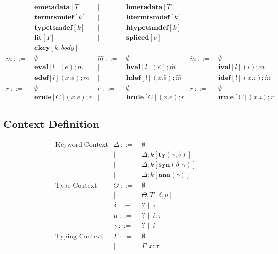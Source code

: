 \documentclass[letterpaper, notitlepage]{article}
\begin{document}
\[\begin{array}{rlrlrl}
				| ~ &~ \mathbf{emetadata}[T]     		& 		 	| ~ &~	\mathbf{hmetadata}[T]\\
				| ~ &~ \mathbf{termtsmdef}[k]     		&			| ~ &~ 	\mathbf{htermtsmdef}[k]\\
				| ~ &~ \mathbf{typetsmdef}[k]			& 			| ~ &~ 	\mathbf{htypetsmdef}[k]\\
				| ~ &~ \mathbf{lit}[T]					& 		 	| ~ &~ 	\mathbf{spliced}[e]\\
				| ~ &~ \mathbf{ekey}[k,body]\\
	m 			~::=&~ \emptyset						&\hat{m}	~::=&~ \emptyset								&\dot{m}	~::=&~ \emptyset\\
				| ~ &~ \mathbf{eval}[l](e);m 			&			| ~ &~ \mathbf{hval}[l](\hat{e});\hat{m} 		&			| ~ &~ \mathbf{ival}[l](i);\dot{m}\\
				| ~ &~ \mathbf{edef}[l](x.e);m 			&			| ~ &~ \mathbf{hdef}[l](x.\hat{e});\hat{m}		&			| ~ &~ \mathbf{idef}[l](x.i);\dot{m}\\
	r 			~::=&~ \emptyset 						&\hat{r} 	~::=&~ \emptyset 								&\dot{r} 	~::=&~ \emptyset\\
				| ~ &~ \mathbf{erule}[C](x.e);r 		& 			| ~ &~ \mathbf{hrule}[C](x.\hat{e});\hat{r} 	&			| ~ &~ \mathbf{irule}[C](x.i);\dot{r}
\end{array}
\]
\subsection{Context Definition}
\[
\begin{array}{rrl}
\text{Keyword Context}	&	\Delta 	~::=&~ 	\emptyset\\
						&			| ~ &~ 	\Delta;k[\mathbf{ty}(\gamma,\delta)]\\
						&			| ~ &~ 	\Delta;k[\mathbf{syn}(\delta,\gamma)]\\
						&			| ~ &~ 	\Delta;k[\mathbf{ana}(\gamma)]\\
\text{Type Context}		&	\Theta 	~::=&~ \emptyset\\
						&			| ~ &~ \Theta,T[\delta,\mu] \\
						&	\delta 	~::=&~ ? ~~ | ~~ \tau\\
						&	\mu	   	~::=&~ ? ~~ | ~~ i:\tau\\
						& 	\gamma  ~::=&~ ? ~~ | ~~ i\\
\text{Typing Context}	&	\Gamma 	~::=&~ \emptyset\\
						&			| ~ &~ \Gamma,x:\tau\\
\end{array}
\]
\end{document}
